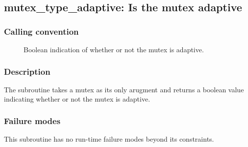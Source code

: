 \clearpage
{}
{}
\label{subr:mutex_type_adaptive}
\subsection*{mutex\_type\_adaptive: Is the mutex adaptive}

\subsubsection*{Calling convention}

\begin{description}
\item[] Boolean indication of whether or not the
  mutex is adaptive.
\end{description}

\subsubsection*{Description}

The  subroutine takes a mutex as its
only arugment and returns a boolean value indicating whether or not
the mutex is adaptive.

\subsubsection*{Failure modes}

This subroutine has no run-time failure modes beyond its constraints.
